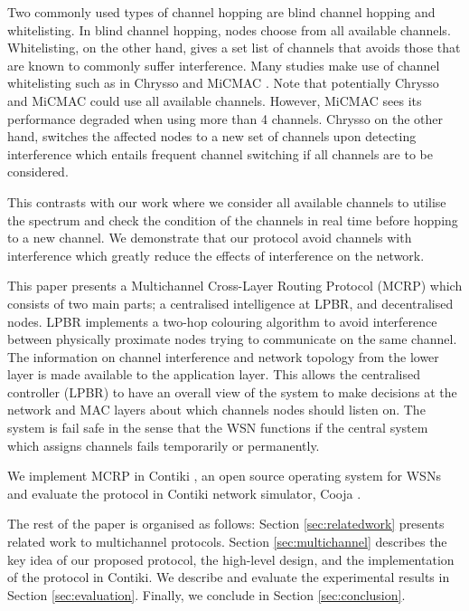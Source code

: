 Two commonly used types of channel hopping \cite{watteyne} are blind channel hopping and whitelisting. In blind channel hopping, nodes choose from all available channels. Whitelisting, on the other hand, gives a set list of channels that avoids those that are known to commonly suffer interference.
Many studies make use of channel whitelisting such as in Chrysso \cite{chrysso} and MiCMAC \cite{micmac}.
Note that potentially Chrysso and MiCMAC could use all available channels.
However, MiCMAC sees its performance degraded when using more than 4 channels.
Chrysso on the other hand, switches the affected nodes to a new set of channels upon detecting interference which entails frequent channel switching if all channels are to be considered. 

This contrasts with our work where we consider all available channels to utilise the spectrum and check the condition of the channels in real time before hopping to a new channel.
We demonstrate that our protocol avoid channels with interference which greatly reduce the effects of interference on the network. 



This paper presents a Multichannel Cross-Layer Routing Protocol (MCRP) which consists of two main parts; a centralised intelligence at LPBR, and decentralised nodes. LPBR implements a two-hop colouring algorithm to avoid interference between physically proximate nodes trying to communicate on the same channel. The information on channel interference and network topology from the lower layer is made available to the application layer. This allows the centralised controller (LPBR) to have an overall view of the system to make decisions at the network and MAC layers about which channels nodes should listen on. The system is fail safe in the sense that the WSN functions if the central system which assigns channels fails temporarily or permanently.

We implement MCRP in Contiki \cite{contiki}, an open source operating system for WSNs and evaluate the protocol in Contiki network simulator, Cooja \cite{cooja}. 

The rest of the paper is organised as follows: Section \ref{sec:relatedwork} presents related work to multichannel protocols. Section \ref{sec:multichannel} describes the key idea of our proposed protocol, the high-level design, and the implementation of the protocol in Contiki. We describe and evaluate the experimental results in Section \ref{sec:evaluation}. Finally, we conclude in Section \ref{sec:conclusion}.
